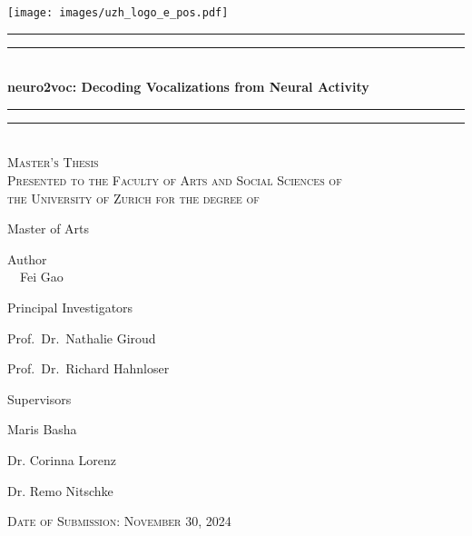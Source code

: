 \documentclass[../CLthesis.tex]{subfiles}
\begin{document}
    \thispagestyle{empty}
    
    \centering %
    \vspace*{-1.2cm}
    \texttt{[image: images/uzh\_logo\_e\_pos.pdf]}\hfill~\\[0.5\baselineskip]

    \rule{\textwidth}{1.6pt}\vspace*{-\baselineskip}\vspace*{2pt}
    \rule{\textwidth}{0.4pt}\\[0.7\baselineskip]

    {\Large\textbf{neuro2voc: Decoding Vocalizations from Neural Activity}}\\[0.2\baselineskip]

    \rule{\textwidth}{0.4pt}\vspace*{-\baselineskip}\vspace{3.2pt}
    \rule{\textwidth}{1.6pt}\\[1\baselineskip]
    
    \scshape %
    Master's Thesis\\[1\baselineskip]

    Presented to the Faculty of Arts and Social Sciences of\\the University of Zurich for the degree of
    
    Master of Arts \par

\vspace*{2\baselineskip}

Author\\
{\Large ~~Fei Gao
}
\vspace*{1.5\baselineskip}

Principal Investigators\\
{\Large Prof.\ Dr.\ Nathalie Giroud \par}
{\Large Prof.\ Dr.\ Richard Hahnloser \par}
\vspace*{1.5\baselineskip}

Supervisors\\
{\Large Maris Basha \par}
{\Large Dr. Corinna Lorenz \par}
{\Large Dr. Remo Nitschke \par}

\vfill
{\scshape Date of Submission: November 30, 2024}
\newpage
\end{document}
